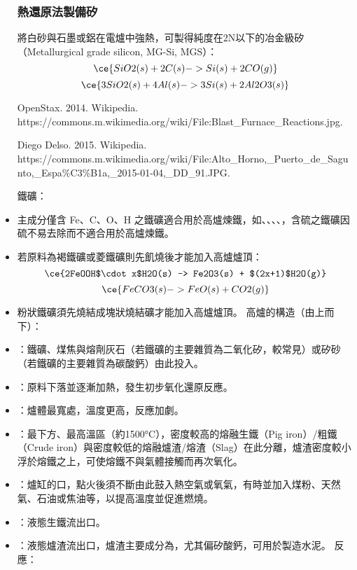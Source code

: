 \documentclass[a4paper,12pt]{report}
\begin{document}
\begin{itemize}
\subsubsection{熱還原法製備矽}
將白砂與石墨或鋁在電爐中強熱，可製得純度在2N以下的冶金級矽（Metallurgical grade silicon, MG-Si, MGS）：
\[\ce{SiO2(s) + 2C(s) -> Si(s) + 2CO(g)}\]
\[\ce{3SiO2(s) + 4Al(s) -> 3Si(s) + 2Al2O3(s)}\]
\bct\bfH\ctr{}\caption{OpenStax. 2014. Wikipedia. https://commons.m.wikimedia.org/wiki/File:Blast\_Furnace\_Reactions.jpg.}\ef\FB\ect
\bct\bfH\ctr{}\caption{Diego Delso. 2015. Wikipedia.\\https://commons.m.wikimedia.org/wiki/File:Alto\_Horno,\_Puerto\_de\_Sagunto,\_Espa\%C3\%B1a,\_2015-01-04,\_DD\_91.JPG.}\ef\FB\ect
鐵礦：
\bit
\item 主成分僅含 Fe、C、O、H 之鐵礦適合用於高爐煉鐵，如、、、、，含硫之鐵礦因硫不易去除而不適合用於高爐煉鐵。
\item 若原料為褐鐵礦或菱鐵礦則先飢燒後才能加入高爐爐頂：
\[\ce{2FeOOH$\cdot x$H2O(s) -> Fe2O3(s) + $(2x+1)$H2O(g)}\]
\[\ce{FeCO3(s) -> FeO(s) + CO2(g)}\]
\item 粉狀鐵礦須先燒結成塊狀燒結礦才能加入高爐爐頂。
\eit
高爐的構造（由上而下）：
\bit
\item {}：鐵礦、煤焦與熔劑灰石（若鐵礦的主要雜質為二氧化矽，較常見）或矽砂（若鐵礦的主要雜質為碳酸鈣）由此投入。
\item {}：原料下落並逐漸加熱，發生初步氧化還原反應。
\item {}：爐體最寬處，溫度更高，反應加劇。
\item {}：最下方、最高溫區（約1500°C），密度較高的熔融生鐵（Pig iron）/粗鐵（Crude iron）與密度較低的熔融爐渣/熔渣（Slag）在此分離，爐渣密度較小浮於熔鐵之上，可使熔鐵不與氣體接觸而再次氧化。
\item {}：爐缸的口，點火後須不斷由此鼓入熱空氣或氧氣，有時並加入煤粉、天然氣、石油或焦油等，以提高溫度並促進燃燒。
\item {}：液態生鐵流出口。
\item {}：液態爐渣流出口，爐渣主要成分為，尤其偏矽酸鈣，可用於製造水泥。
\eit
反應：
\bit

\end{itemize}
\end{document}
